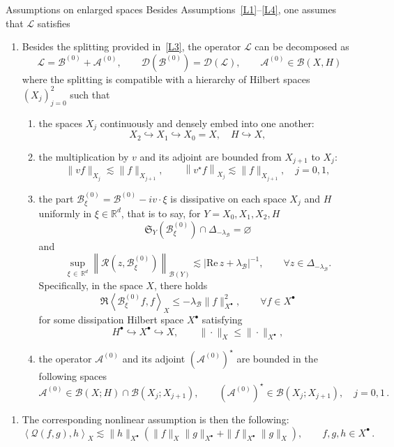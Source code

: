 \documentclass[AHL,Unicode,longabstracts,published]{cedram}
\newcommand{\re}{\mathrm{Re}\,}
\newcommand{\R}{\mathbb{R}}
\newcommand{\fkS}{\mathfrak{S}}
\renewcommand{\AA}{\mathcal{A}}
\newcommand{\BB}{\mathcal{B}}
\newcommand{\LL}{\mathcal{L}}
\newcommand{\QQ}{\mathcal{Q}}
\newcommand{\RR}{\mathcal{R}}
\newcommand{\dom}{\mathscr{D}}
\newcommand{\BBB}{\mathscr{B}}
\newcommand{\Ss}{H}
\newcommand{\Ssp}{H^{\bullet}}
\newcommand{\Sl}{X}
\newcommand{\Slp}{X^{\bullet}}
\newcommand{\Sg}{Y}
\renewcommand*\le{\leqslant}
\newcommand{\hypst}[1]{\textnormal{\textbf{#1}}}
\newcommand{\lla}{\left\langle}
\newcommand{\rra}{\right\rangle}
\let\oldforall\forall
\renewcommand*{\forall}{\mathrel{\oldforall}}
\begin{document}
\begin{enonce*}{Assumptions on enlarged spaces}
Besides Assumptions~\eqref{L1}--\eqref{L4}, one assumes that $\LL$ satisfies
\begin{enumerate}[label=\hypst{LE}]
\item \label{LE}
Besides the splitting provided in~\eqref{L3}, the operator $\LL$ can be decomposed as
\[
\LL = \BB^{(0)}+ \AA^{(0)}, \qquad \dom\left(\BB^{(0)}\right)=\dom(\LL), \qquad \AA^{(0)} \in \BBB(\Sl,\Ss)
\]
where the splitting is compatible with a hierarchy of Hilbert spaces $\left(\Sl_j\right)_{j=0}^{2}$ such that
\begin{enumerate}
\item the spaces $\Sl_j$ continuously and densely embed into one another:
\[
\Sl_{2} \hookrightarrow \Sl_{1} \hookrightarrow \Sl_{0} =\Sl, \quad \Ss \hookrightarrow \Sl,
\]
\item \label{assumption_large_multi-v}
the multiplication by $v$ and its adjoint are bounded from $\Sl_{j+1}$ to $\Sl_{j}$:
\begin{equation*}
\|v f\|_{\Sl_{j}} \lesssim \|f\|_{\Sl_{j+1}}, \qquad
\left\|v^{\star} f\right\|_{\Sl_{j}} \lesssim \|f\|_{\Sl_{j+1}}, \quad j=0,1,
\end{equation*}
\item the part $\BB^{(0)}_{\xi} = \BB^{(0)} - i v \cdot \xi$ is dissipative on each space $\Sl_j$ and $\Ss$ uniformly in $\xi \in \R^d$, that is to say, for $\Sg = \Sl_0, \Sl_1, \Sl_2, \Ss$
\[
\fkS_\Sg\left(\BB_{\xi}^{(0)} \right) \cap \Delta_{-\lambda_\BB} = \varnothing
\]
and
\[
\sup_{\xi\,\in\,\R^d}\left\|\RR\left(z,\BB^{(0)}_{\xi} \right)\right\|_{\BBB(\Sg)} \lesssim | \re z + \lambda_\BB|^{-1}, \qquad \forall z \in \Delta_{-\lambda_\BB}.
\]
Specifically, in the space $\Sl$, there holds
\[
\Re \lla \BB^{(0)}_{\xi} f, f \rra_{\Sl} \le - \lambda_\BB \| f \|_{\Slp}^2, \qquad \forall f \in \Slp
\]
for some dissipation Hilbert space $\Slp$ satisfying
\[
\Ssp \hookrightarrow \Slp \hookrightarrow \Sl, \qquad \| \cdot \|_{\Sl} \le \| \cdot \|_{\Slp},
\]
\item \label{assumption_large_bounded_A}
the operator $\AA^{(0)}$ and its adjoint $(\AA^{(0)})^{\star}$ are bounded in the following spaces
\[
\AA^{(0)} \in \BBB(\Sl;\Ss) \cap \BBB\left(\Sl_{j};\Sl_{j+1}\right), \qquad \left(\AA^{(0)}\right)^{\star} \in \BBB\left(\Sl_{j};\Sl_{j+1}\right), \quad j=0,1\,.
\]
\end{enumerate}
\end{enumerate}
\begin{enumerate}[label=\hypst{BE}]
\item \label{BE}
The corresponding nonlinear assumption is then the following:
\[
\lla \QQ(f, g), h \rra_{\Sl} \lesssim \| h \|_{\Slp} \left(\| f \|_{\Sl} \| g \|_{\Slp} + \| f \|_{\Slp} \| g \|_{\Sl} \right), \qquad f,g,h \in \Slp\,.
\]
\end{enumerate}
\end{enonce*}
\end{document}
